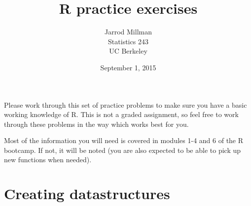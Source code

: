 \documentclass{article}
\title{R practice exercises}
\date{September 1, 2015}
\author{Jarrod Millman\\ Statistics 243\\ UC Berkeley}
\begin{document}
\maketitle

Please work through this set of practice problems to make sure you have a
basic working knowledge of R.  This is not a graded assignment,
so feel free to work through these problems in the way which works best
for you.

Most of the information you will need is covered in modules 1-4 and 6 of the R
bootcamp.  If not, it will be noted (you are also expected to be able to pick
up new functions when needed).


\section*{Creating datastructures}
\end{document}
